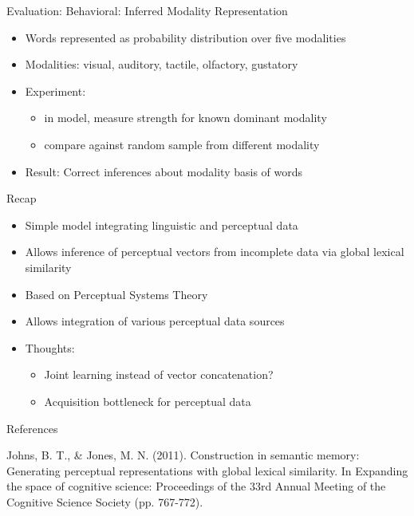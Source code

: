 \documentclass[12pt,a4paper]{beamer}
\begin{document}
\begin{frame}{Evaluation: Behavioral: Inferred Modality Representation}
\begin{itemize}
\item Words represented as probability distribution over five modalities
\item Modalities: visual, auditory, tactile, olfactory, gustatory
\item Experiment:
    \begin{itemize}
    \item in model, measure strength for known dominant modality
    \item compare against random sample from different modality
    \end{itemize}
\item Result: Correct inferences about modality basis of words
\end{itemize}
\end{frame}


\begin{frame}{Recap}
\begin{itemize}
\item Simple model integrating linguistic and perceptual data
\item Allows inference of perceptual vectors from incomplete data via global lexical similarity
\item Based on Perceptual Systems Theory
\item Allows integration of various perceptual data sources
\item Thoughts:
    \begin{itemize}
    \item Joint learning instead of vector concatenation?
    \item Acquisition bottleneck for perceptual data
    \end{itemize}

\end{itemize}
\end{frame}




\begin{frame}{References}
\begin{thebibliography}{-}
 Johns, B. T., \& Jones, M. N. (2011). Construction in semantic memory: Generating perceptual representations with global lexical similarity. In Expanding the space of cognitive science: Proceedings of the 33rd Annual Meeting of the Cognitive Science Society (pp. 767-772).
\end{thebibliography}
\end{frame}
\end{document}
